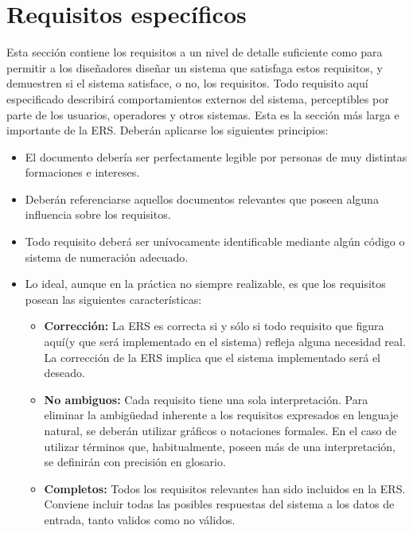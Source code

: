 \documentclass[12pt,a4paper, twosite]{book}
\begin{document}
\section{Requisitos específicos}
\label{sec:org40573d1}

Esta sección contiene los requisitos a un nivel de detalle suficiente
como para permitir a los diseñadores diseñar un sistema que
satisfaga estos requisitos, y demuestren si el sistema satisface, o
no, los requisitos. Todo requisito aquí especificado describirá
comportamientos externos del sistema, perceptibles por parte de los
usuarios, operadores y otros sistemas. Esta es la sección más larga
e importante de la ERS. Deberán aplicarse los siguientes principios:

\begin{itemize}
\item El documento debería ser perfectamente legible por personas de muy
distintas formaciones e intereses.

\item Deberán referenciarse aquellos documentos relevantes que poseen
alguna influencia sobre los requisitos.

\item Todo requisito deberá ser unívocamente identificable mediante algún
código o sistema de numeración adecuado.

\item Lo ideal, aunque en la práctica no siempre realizable, es que los
requisitos posean las siguientes características: 

\begin{itemize}
\item \textbf{Corrección:} La ERS es correcta si y sólo si todo requisito que
figura aquí(y que será implementado en el sistema) refleja alguna
necesidad real. La corrección de la ERS implica que el sistema
implementado será el deseado.

\item \textbf{No ambiguos:} Cada requisito tiene una sola interpretación. Para
eliminar la ambigüedad inherente a los requisitos expresados en
lenguaje natural, se deberán utilizar gráficos o notaciones
formales. En el caso de utilizar términos que, habitualmente,
poseen más de una interpretación, se definirán con precisión en
glosario.

\item \textbf{Completos:} Todos los requisitos relevantes han sido incluidos en
la ERS. Conviene incluir todas las posibles respuestas del sistema
a los datos de entrada, tanto validos como no válidos.


\end{itemize}
\end{itemize}
\end{document}
